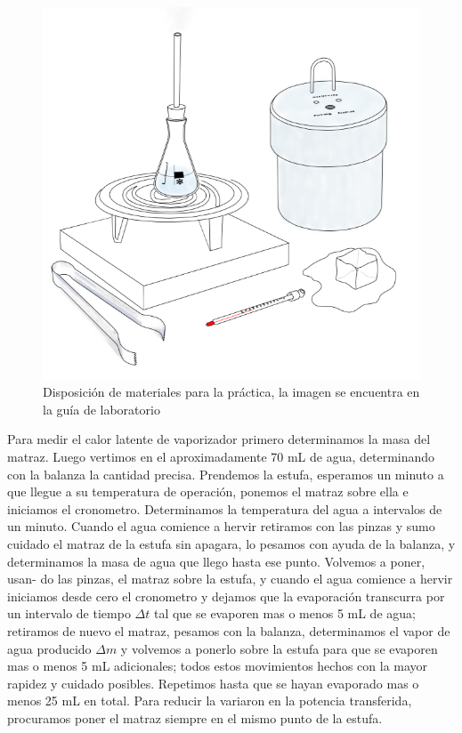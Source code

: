 \documentclass[DIV=calc, paper=a4, fontsize=11pt, twocolumn, spanish]{scrartcl}	 %
\begin{document}
\begin{figure}[htbp]
\centering
	\includegraphics[scale=0.6]{data/img/proc}
	\caption{Disposición de materiales para la práctica, la imagen se encuentra en la guía de laboratorio}
\end{figure}

Para medir el calor latente de vaporizador primero determinamos la masa del matraz. Luego vertimos en el aproximadamente 70 mL de agua, determinando con la balanza la cantidad precisa. Prendemos la estufa, esperamos un minuto a que llegue a su temperatura de operación, ponemos el matraz sobre ella e iniciamos el cronometro. Determinamos la temperatura del agua a intervalos de un minuto. Cuando el agua comience a hervir retiramos con las pinzas y sumo cuidado el matraz de la estufa sin apagara, lo pesamos con ayuda de la balanza, y determinamos la masa de agua que llego hasta ese punto. Volvemos a poner, usan- do las pinzas, el matraz sobre la estufa, y cuando el agua comience a hervir iniciamos desde cero el cronometro y dejamos que la evaporación transcurra por un intervalo de tiempo $\Delta t$ tal que se evaporen mas o menos 5 mL de agua; retiramos de nuevo el matraz, pesamos con la balanza, determinamos el vapor de agua producido $\Delta m$ y volvemos a ponerlo sobre la estufa para que se evaporen mas o menos 5 mL adicionales; todos estos movimientos hechos con la mayor rapidez y cuidado posibles. Repetimos hasta que se hayan evaporado mas o menos 25 mL en total. Para reducir la variaron en la potencia transferida, procuramos poner el matraz siempre en el mismo punto de la estufa.
\end{document}
